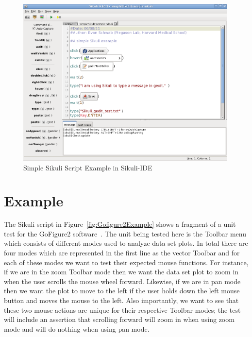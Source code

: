 \documentclass{InsightArticle}
\begin{document}
\begin{figure}[htbp]
 \centering
 \includegraphics[width=0.99\textwidth]{Images/SimpleSikuliExample.png}
 \caption{Simple Sikuli Script Example in Sikuli-IDE}
 \label{fig:SimpleExample}
\end{figure}

\section{Example}

The Sikuli script in Figure~\ref{fig:Gofigure2Example} shows a fragment of a
unit test for the GoFigure2 software~\cite{GoFigure2:Website}. The unit being
tested here is the Toolbar menu which consists of different modes used to
analyze data set plots. In total there are four modes which are represented in
the first line as the vector Toolbar and for each of these modes we want to test
their expected mouse functions. For instance, if we are in the zoom Toolbar
mode then we want the data set plot to zoom in when the user scrolls the mouse
wheel forward. Likewise, if we are in pan mode then we want the plot to move to
the left if the user holds down the left mouse button and moves the mouse to the
left.  Also importantly, we want to see that these two mouse actions are unique
for their respective Toolbar modes; the test will include an assertion that
scrolling forward will zoom in when using zoom mode and will do nothing when
using pan mode.\\
\end{document}
